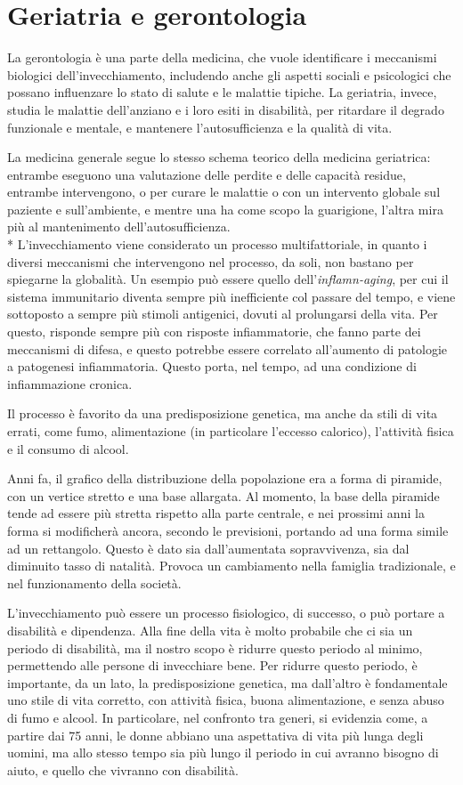 \mainmatter
\chapter{Geriatria e gerontologia}
La gerontologia è una parte della medicina, che vuole identificare i meccanismi 
biologici dell'invecchiamento, 
includendo anche gli aspetti sociali e psicologici che possano influenzare lo 
stato di salute e le malattie tipiche.
La geriatria, invece, studia le malattie dell'anziano e i loro esiti in 
disabilità, per ritardare il degrado funzionale 
e mentale, e mantenere l'autosufficienza e la qualità di vita.

La medicina generale segue lo stesso schema teorico della medicina geriatrica: 
entrambe eseguono una valutazione delle 
perdite e delle capacità residue, entrambe intervengono, o per curare le
malattie o con un intervento globale sul paziente e sull'ambiente, e mentre una
ha come scopo la guarigione, l'altra mira più al mantenimento
dell'autosufficienza. \\* L'invecchiamento viene 
considerato un processo multifattoriale, in quanto i diversi meccanismi che 
intervengono nel processo, da soli, non bastano per spiegarne la globalità. Un 
esempio può essere quello dell'\textit{inflamn-aging}, per cui il sistema 
immunitario diventa sempre più inefficiente col passare del tempo, e viene 
sottoposto a sempre più stimoli antigenici, dovuti al prolungarsi della vita. 
Per questo, risponde sempre più con risposte infiammatorie, che fanno parte dei 
meccanismi di difesa, e questo potrebbe essere correlato all'aumento di 
patologie a patogenesi infiammatoria. Questo porta, nel tempo, ad una 
condizione di infiammazione cronica.

Il processo è favorito da una predisposizione genetica, ma anche da stili di 
vita errati, come fumo, alimentazione (in particolare l'eccesso calorico), 
l'attività fisica e il consumo di alcool.

Anni fa, il grafico della distribuzione della popolazione era a forma di 
piramide, con un vertice stretto e una base allargata. Al momento, la base 
della piramide tende ad essere più stretta rispetto alla parte centrale, e nei 
prossimi anni la forma si modificherà ancora, secondo le previsioni, portando 
ad una forma simile ad un rettangolo. Questo è dato sia dall'aumentata 
sopravvivenza, sia dal diminuito tasso di natalità. Provoca un cambiamento 
nella famiglia tradizionale, e nel funzionamento della società.

L'invecchiamento può essere un processo fisiologico, di successo, o può portare 
a disabilità e dipendenza. Alla fine della vita è molto probabile che ci sia un 
periodo di disabilità, ma il nostro scopo è ridurre questo periodo al minimo, 
permettendo alle persone di invecchiare bene. Per ridurre questo periodo, è 
importante, da un lato, la predisposizione genetica, ma dall'altro è
fondamentale uno stile di vita corretto, con attività fisica, buona 
alimentazione, e senza abuso di fumo e alcool. In particolare, nel confronto 
tra generi, si evidenzia come, a partire dai 75 anni, le donne abbiano una 
aspettativa di vita più lunga degli uomini, ma allo stesso tempo sia più lungo 
il periodo in cui avranno bisogno di aiuto, e quello che vivranno con 
disabilità.


